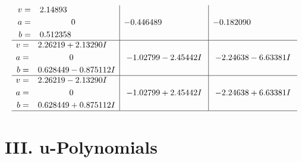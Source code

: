 \documentclass[1p]{elsarticle_modified}
\theoremstyle{definition}
\begin{document}
$$\begin{array}{c|c|c}
\begin{aligned}
v &= \phantom{-}2.14893\phantom{ +0.000000I} \\
a &= \phantom{-0.000000 } 0 \\
b &= \phantom{-}0.512358\phantom{ +0.000000I}\end{aligned}
 & -0.446489\phantom{ +0.000000I} & -0.182090\phantom{ +0.000000I} \\ \hline\begin{aligned}
v &= \phantom{-}2.26219 + 2.13290 I \\
a &= \phantom{-0.000000 } 0 \\
b &= \phantom{-}0.628449 - 0.875112 I\end{aligned}
 & -1.02799 - 2.45442 I & -2.24638 - 6.63381 I \\ \hline\begin{aligned}
v &= \phantom{-}2.26219 - 2.13290 I \\
a &= \phantom{-0.000000 } 0 \\
b &= \phantom{-}0.628449 + 0.875112 I\end{aligned}
 & -1.02799 + 2.45442 I & -2.24638 + 6.63381 I\\
 \hline 
 \end{array}$$\newpage
\newpage\renewcommand{\arraystretch}{1}
\centering \section*{ III. u-Polynomials}
\end{document}
